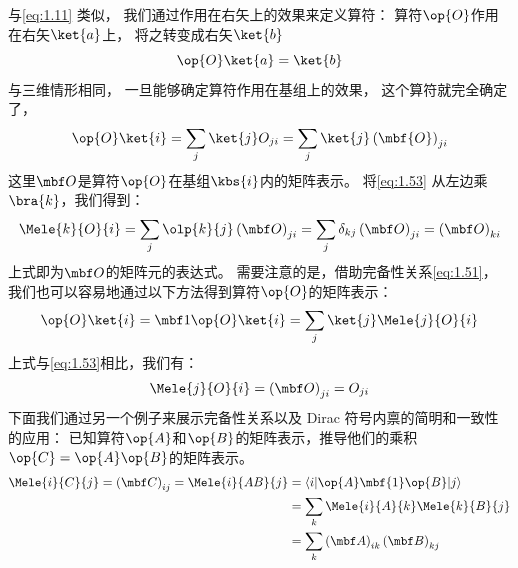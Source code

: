 与\autoref{eq:1.11} 类似，
我们通过作用在右矢上的效果来定义算符：
算符$\op{O}$作用在右矢$\ket{a}$上，
将之转变成右矢$\ket{b}$
\begin{equation}
 \op{O}\ket{a} = \ket{b}
 \label{eq:1.52}
\end{equation}
与三维情形相同，
一旦能够确定算符作用在基组上的效果，
这个算符就完全确定了，
\begin{equation}
 \op{O}\ket{i} = \sum_j\ket{j}O_{ji} = \sum_j\ket{j}\left(\mbf{O}\right)_{ji}
 \label{eq:1.53}
\end{equation}
这里$\mbf O$是算符$\op{O}$在基组$\kbs{i}$内的矩阵表示。
将\autoref{eq:1.53} 从左边乘$\bra{k}$，我们得到：
\begin{equation}
 \Mele{k}{O}{i} = \sum_j\olp{k}{j}\left(\mbf O\right)_{ji} = \sum_j\delta_{kj} \left(\mbf O\right)_{ji} = \left(\mbf O\right)_{ki}
 \label{eq:1.54}
\end{equation}
上式即为$\mbf O$的矩阵元的表达式。
需要注意的是，借助完备性关系\autoref{eq:1.51}，
我们也可以容易地通过以下方法得到算符$\op{O}$的矩阵表示：
\begin{equation}
 \op{O}\ket{i} = {\mbf 1}\op{O}\ket{i} = \sum_j\ket{j}\Mele{j}{O}{i}
 \label{eq:1.55}
\end{equation}
上式与\autoref{eq:1.53}相比，我们有：
\begin{equation}
 \Mele{j}{O}{i} = \left(\mbf O\right)_{ji} = O_{ji}
 \label{eq:1.56}
\end{equation}
下面我们通过另一个例子来展示完备性关系以及 Dirac 符号内禀的简明和一致性的应用：
已知算符$\op{A}$和$\op{B}$的矩阵表示，推导他们的乘积$\op{C} = \op{A}\op{B}$的矩阵表示。
\[
\begin{split}
 \Mele{i}{C}{j} = \left(\mbf C\right)_{ij} = \Mele{i}{AB}{j} &= \left\langle i\middle\vert\op{A}\mbf{1}\op{B}\middle\vert j\right\rangle \\
 &= \sum_k \Mele{i}{A}{k} \Mele{k}{B}{j} \\
 &= \sum_k \left(\mbf A\right)_{ik} \left(\mbf B\right)_{kj}
\end{split}
\]

